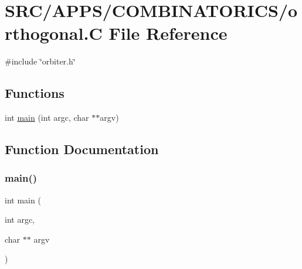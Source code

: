 \hypertarget{_a_p_p_s_2_c_o_m_b_i_n_a_t_o_r_i_c_s_2orthogonal_8_c}{}\section{S\+R\+C/\+A\+P\+P\+S/\+C\+O\+M\+B\+I\+N\+A\+T\+O\+R\+I\+C\+S/orthogonal.C File Reference}
\label{_a_p_p_s_2_c_o_m_b_i_n_a_t_o_r_i_c_s_2orthogonal_8_c}
{\ttfamily \#include \char`\"{}orbiter.\+h\char`\"{}}\newline
\subsection*{Functions}
\begin{DoxyCompactItemize}
\item 
int \mbox{\hyperlink{_a_p_p_s_2_c_o_m_b_i_n_a_t_o_r_i_c_s_2orthogonal_8_c_a3c04138a5bfe5d72780bb7e82a18e627}{main}} (int argc, char $\ast$$\ast$argv)
\end{DoxyCompactItemize}


\subsection{Function Documentation}
\mbox{\label{_a_p_p_s_2_c_o_m_b_i_n_a_t_o_r_i_c_s_2orthogonal_8_c_a3c04138a5bfe5d72780bb7e82a18e627}} 
\subsubsection{\texorpdfstring{main()}{main()}}
{\footnotesize\ttfamily int main (\begin{DoxyParamCaption}\item[{int}]{argc,  }\item[{char $\ast$$\ast$}]{argv }\end{DoxyParamCaption})}


